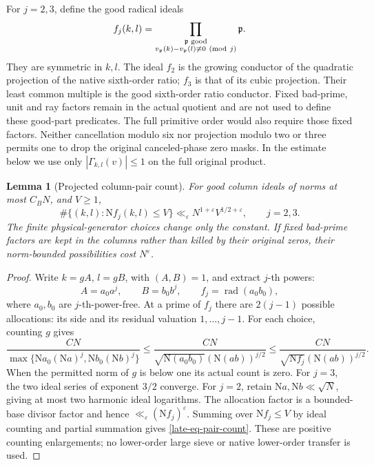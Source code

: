 \documentclass[11pt]{article}
\newtheorem{lemma}[theorem]{Lemma}
\theoremstyle{definition}
\newcommand{\N}{\mathrm N}
\newcommand{\eps}{\varepsilon}
\begin{document}
For $j=2,3$, define the good radical ideals
\begin{equation}
 f_j(k,l)=
 \prod_{\substack{\mathfrak p\text{ good}\\
      v_{\mathfrak p}(k)-v_{\mathfrak p}(l)\not\equiv0\ ({\rm mod}\ j)}}
                  \mathfrak p.
 \label{late-eq-components}
\end{equation}
They are symmetric in $k,l$.  The ideal $f_2$ is the growing
conductor of the quadratic projection of the native sixth-order
ratio; $f_3$ is that of its cubic projection.  Their least common
multiple is the good sixth-order ratio conductor.  Fixed bad-prime,
unit and ray factors remain in the actual quotient and are not used
to define these good-part predicates.  The full primitive order
would also require those fixed factors.  Neither cancellation modulo
six nor projection modulo two or three permits one to drop the
original canceled-phase zero masks.  In the estimate below we use only
$|\Gamma_{k,l}(v)|\le1$ on the full original product.

\begin{lemma}[Projected column-pair count]
\label{late-lem-pair-count}
For good column ideals of norms at most $C_BN$, and $V\ge1$,
\begin{equation}
 \#\{(k,l):\N f_j(k,l)\le V\}
                \ll_\eps N^{1+\eps}V^{1/2+\eps},\qquad j=2,3.
 \label{late-eq-pair-count}
\end{equation}
The finite physical-generator choices change only the constant.  If
fixed bad-prime factors are kept in the columns rather than killed by
their original zeros, their norm-bounded possibilities cost $N^\eps$.
\end{lemma}

\begin{proof}
Write $k=gA$, $l=gB$, with $(A,B)=1$, and extract $j$-th powers:
\[
 A=a_0a^j,\qquad B=b_0b^j,
 \qquad f_j=\operatorname{rad}(a_0b_0),
\]
where $a_0,b_0$ are $j$-th-power-free.  At a prime of $f_j$ there
are $2(j-1)$ possible allocations: its side and its residual
valuation $1,\ldots,j-1$.  For each choice, counting $g$ gives
\[
 \frac{C N}{\max\{\N a_0(\N a)^j,\N b_0(\N b)^j\}}
 \le\frac{C N}{\sqrt{\N(a_0b_0)}(\N(ab))^{j/2}}
 \le\frac{C N}{\sqrt{\N f_j}(\N(ab))^{j/2}}.
\]
When the permitted norm of $g$ is below one its actual count is zero.
For $j=3$, the two ideal series of exponent $3/2$ converge.  For
$j=2$, retain $\N a,\N b\ll\sqrt N$, giving at most two harmonic
ideal logarithms.  The allocation factor is a bounded-base divisor
factor and hence $\ll_\eps(\N f_j)^\eps$.  Summing over
$\N f_j\le V$ by ideal counting and partial summation gives
\eqref{late-eq-pair-count}.  These are positive counting enlargements;
no lower-order large sieve or native lower-order transfer is used.
\end{proof}
\end{document}
